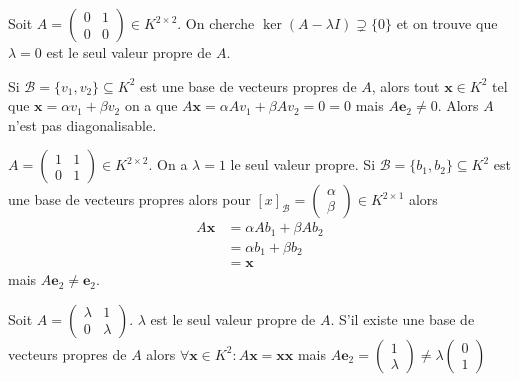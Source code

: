 \begin{example}
Soit $A=\begin{pmatrix}0 & 1 \\ 0 & 0\end{pmatrix}\in K^{2\times2}$. On cherche $\ker(A-\lambda I)\supsetneq \{ 0 \}$ et on trouve que $\lambda=0$ est le seul valeur propre de $A$.


Si $\mathscr{B}=\{v_{1},v_{2}\}\subseteq K^{2}$ est une base de vecteurs propres de $A$, alors tout $\boldsymbol{x}\in K^{2}$ tel que $\boldsymbol{x}=\alpha v_{1}+\beta v_{2}$ on a que $A\boldsymbol{x}=\alpha Av_{1}+\beta Av_{2}=0=0$ mais $A\boldsymbol{e}_{2}\neq 0$. Alors $A$ n'est pas diagonalisable.
\end{example}
\begin{example}
$A=\begin{pmatrix}1 & 1 \\ 0 & 1\end{pmatrix}\in K^{2\times 2}$. On a $\lambda=1$ le seul valeur propre. Si $\mathscr{B}=\{b_{1},b_{2} \}\subseteq K^{2}$ est une base de vecteurs propres alors pour $[x]_{\mathscr{B}}=\begin{pmatrix}\alpha \\ \beta\end{pmatrix}\in K^{2\times1}$ alors
\begin{align*}
A\boldsymbol{x} & =\alpha Ab_{1}+\beta Ab_{2} \\
 & =\alpha b_{1}+\beta b_{2} \\
 & =\boldsymbol{x}
\end{align*}
mais $A\boldsymbol{e}_{2}\neq \boldsymbol{e}_{2}$.
\end{example}
\begin{example}
Soit $A=\begin{pmatrix}\lambda & 1 \\ 0 & \lambda \end{pmatrix}$. $\lambda$ est le seul valeur propre de $A$. S'il existe une base de vecteurs propres de $A$ alors $\forall \boldsymbol{x}\in K^{2}:A\boldsymbol{x}=\boldsymbol{x}\boldsymbol{x}$ mais $A\boldsymbol{e}_{2}=\begin{pmatrix}1 \\ \lambda\end{pmatrix}\neq \lambda \begin{pmatrix}0 \\ 1\end{pmatrix}$
\end{example}

